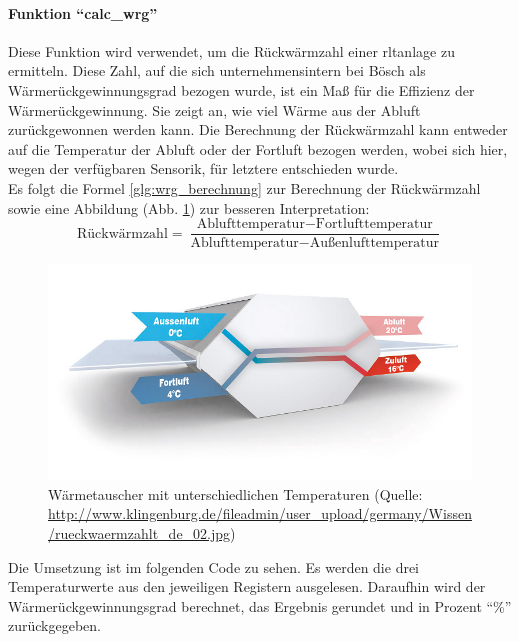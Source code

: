 \paragraph{Funktion \enquote{calc\_wrg}}
Diese Funktion wird verwendet, um die Rückwärmzahl einer \acs{rltanlage} zu ermitteln. Diese Zahl, auf die sich unternehmensintern bei Bösch als Wärmerückgewinnungsgrad bezogen wurde, ist ein Maß für die Effizienz der Wärmerückgewinnung. Sie zeigt an, wie viel Wärme aus der Abluft zurückgewonnen werden kann. Die Berechnung der Rückwärmzahl kann entweder auf die Temperatur der Abluft oder der Fortluft bezogen werden, wobei sich hier, wegen der verfügbaren Sensorik, für letztere entschieden wurde. \cite[vgl.][]{Klingenburg:o.J.}\\
Es folgt die Formel \eqref{glg:wrg_berechnung} zur Berechnung der Rückwärmzahl sowie eine Abbildung (Abb. \ref{fig:waermetauscher_wrg}) zur besseren Interpretation: 
\begin{equation}
	\text{Rückwärmzahl} = \frac{\text{Ablufttemperatur} - \text{Fortlufttemperatur}}{\text{Ablufttemperatur} - \text{Außenlufttemperatur}}
	\label{glg:wrg_berechnung}
\end{equation} 

\begin{figure}[H]
	\centering
	\includegraphics[width=0.7\linewidth]{Bilder/rueckwaermzahl_waermetauscher}
	\caption[Wärmetauscher mit unterschiedlichen Temperaturen (Quelle: \url{http://www.klingenburg.de/fileadmin/user_upload/germany/Wissen/rueckwaermzahlt_de_02.jpg}, Zugriff am 18.02.2024)]{Wärmetauscher mit unterschiedlichen Temperaturen (Quelle: \url{http://www.klingenburg.de/fileadmin/user_upload/germany/Wissen/rueckwaermzahlt_de_02.jpg})}
	\label{fig:waermetauscher_wrg}
\end{figure}
 
Die Umsetzung ist im folgenden Code zu sehen. Es werden die drei Temperaturwerte aus den jeweiligen Registern ausgelesen. Daraufhin wird der Wärmerückgewinnungsgrad berechnet, das Ergebnis gerundet und in Prozent \enquote{\%} zurückgegeben.

